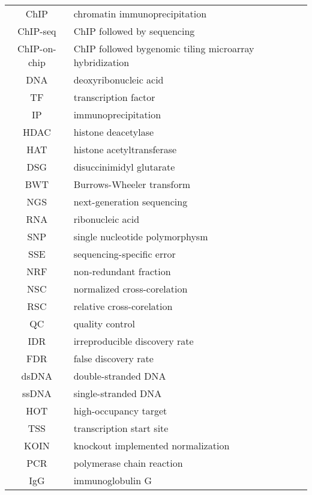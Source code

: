 \documentclass[11pt,a4paper]{report}
\begin{document}



\tableofcontents


\begin{tabular}{c l}
	ChIP & chromatin immunoprecipitation \\
	ChIP-seq & ChIP followed by sequencing \\
	ChIP-on-chip & ChIP followed bygenomic tiling microarray hybridization \\
	DNA & deoxyribonucleic acid \\
	TF & transcription factor \\
	IP & immunoprecipitation \\
	HDAC & histone deacetylase \\
	HAT & histone acetyltransferase \\
	DSG & disuccinimidyl glutarate \\
	BWT & Burrows-Wheeler transform \\
	NGS & next-generation sequencing \\
	RNA & ribonucleic acid \\
	SNP & single nucleotide polymorphysm \\
	SSE & sequencing-specific error \\
	NRF & non-redundant fraction \\
	NSC & normalized cross-corelation \\
	RSC & relative cross-corelation \\
	QC & quality control \\
	IDR & irreproducible discovery rate \\
	FDR & false discovery rate \\
	dsDNA & double-stranded DNA \\
	ssDNA & single-stranded DNA \\
	HOT & high-occupancy target \\
	TSS & transcription start site \\
	KOIN & knockout implemented normalization \\
	PCR & polymerase chain reaction \\
	IgG & immunoglobulin G \\
	
\end{tabular}
\end{document}
